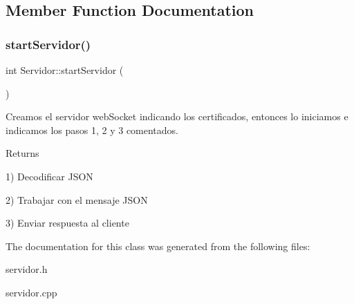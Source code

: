 \subsection{Member Function Documentation}
\mbox{\label{classServidor_a43733f2069b63eb58edcbb61fa6a63ec}} 
\subsubsection{\texorpdfstring{start\+Servidor()}{startServidor()}}
{\footnotesize\ttfamily int Servidor\+::start\+Servidor (\begin{DoxyParamCaption}{ }\end{DoxyParamCaption})}



Creamos el servidor web\+Socket indicando los certificados, entonces lo iniciamos e indicamos los pasos 1, 2 y 3 comentados. 

\begin{DoxyReturn}{Returns}

\end{DoxyReturn}
1) Decodificar J\+S\+ON

2) Trabajar con el mensaje J\+S\+ON

3) Enviar respuesta al cliente 

The documentation for this class was generated from the following files\+:\begin{DoxyCompactItemize}
\item 
servidor.\+h\item 
servidor.\+cpp\end{DoxyCompactItemize}
